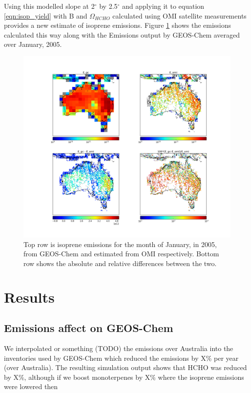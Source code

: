 \documentclass[acp, manuscript]{copernicus} %
\begin{document}
    Using this modelled slope at 2$^{\circ}$ by 2.5$^{\circ}$ and applying it to equation \ref{eqn:isop_yield} with B and $\Omega_{HCHO}$ calculated using OMI satellite measurements provides a new estimate of isoprene emissions.
    Figure \ref{fig:E_isop_200501} shows the emissions calculated this way along with the Emissions output by GEOS-Chem averaged over January, 2005.
    
    
    \begin{figure}[!htbp]
      \includegraphics[width=\textwidth]{figures/E_Comparison.png}
      \caption{%
	Top row is isoprene emissions for the month of January, in 2005, from GEOS-Chem and estimated from OMI respectively.
	Bottom row shows the absolute and relative differences between the two.
      }
      \label{fig:E_isop_200501}
    \end{figure}
    
    
\section{Results}
  
  \subsection{Emissions affect on GEOS-Chem}
    We interpolated or something (TODO) the emissions over Australia into the inventories used by GEOS-Chem which reduced the emissions by X\% per year (over Australia).
    The resulting simulation output shows that HCHO was reduced by X\%, although if we boost monoterpenes by X\% where the isoprene emissions were lowered then 
    
\end{document}
